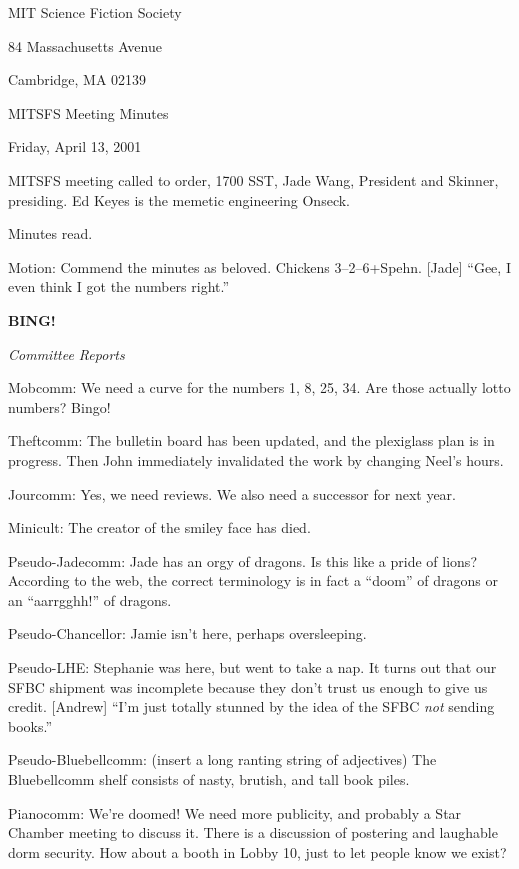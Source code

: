 \documentclass[12pt]{article}
\newcommand{\bing}{{\bf BING!} }
\newcommand{\goto}[1]{\bing \vskip 12pt \centerline{{\em{#1}}}}
\begin{document}
\begin{center}

MIT Science Fiction Society 

84 Massachusetts Avenue

Cambridge, MA 02139

\vspace{12pt}

MITSFS Meeting Minutes 

Friday, April 13, 2001

\end{center}
 
\vspace{18pt}

\setlength{\parskip}{6pt}

\noindent
MITSFS meeting called to order, 1700 SST, Jade Wang, President and
Skinner, presiding.  Ed Keyes is the memetic engineering Onseck.

Minutes read.

Motion: Commend the minutes as beloved.  Chickens 3--2--6+Spehn.
[Jade] ``Gee, I even think I got the numbers right.''

\goto{Committee Reports}

Mobcomm: We need a curve for the numbers 1, 8, 25, 34.  Are those
actually lotto numbers?  Bingo!

Theftcomm: The bulletin board has been updated, and the plexiglass
plan is in progress.  Then John immediately invalidated the work
by changing Neel's hours.

Jourcomm: Yes, we need reviews.  We also need a successor for next
year.

Minicult: The creator of the smiley face has died.

Pseudo-Jadecomm: Jade has an orgy of dragons.  Is this like a pride
of lions?  According to the web, the correct terminology is in fact
a ``doom'' of dragons or an ``aarrgghh!'' of dragons.

Pseudo-Chancellor: Jamie isn't here, perhaps oversleeping.

Pseudo-LHE: Stephanie was here, but went to take a nap.  It turns
out that our SFBC shipment was incomplete because they don't trust
us enough to give us credit.  [Andrew] ``I'm just totally stunned
by the idea of the SFBC {\em not} sending books.''

Pseudo-Bluebellcomm: (insert a long ranting string of adjectives)
The Bluebellcomm shelf consists of nasty, brutish, and tall book
piles.

Pianocomm: We're doomed!  We need more publicity, and probably a
Star Chamber meeting to discuss it.  There is a discussion of
postering and laughable dorm security.  How about a booth in Lobby
10, just to let people know we exist?
\end{document}
